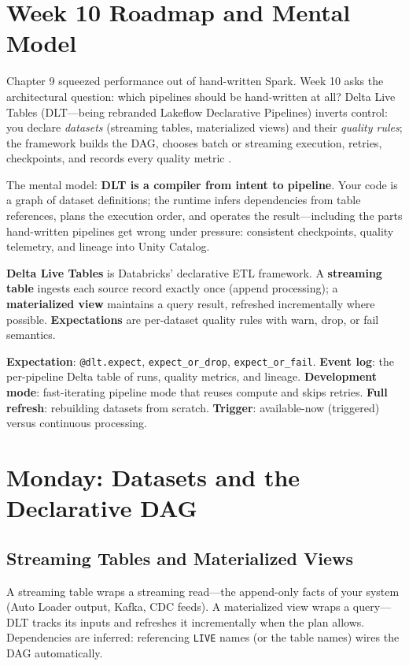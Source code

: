 \section{Week 10 Roadmap and Mental Model}
Chapter 9 squeezed performance out of hand-written Spark. Week 10 asks the architectural question: which pipelines should be hand-written at all? Delta Live Tables (DLT---being rebranded Lakeflow Declarative Pipelines) inverts control: you declare \emph{datasets} (streaming tables, materialized views) and their \emph{quality rules}; the framework builds the DAG, chooses batch or streaming execution, retries, checkpoints, and records every quality metric \cite{databricksDLT}.

The mental model: \textbf{DLT is a compiler from intent to pipeline}. Your code is a graph of dataset definitions; the runtime infers dependencies from table references, plans the execution order, and operates the result---including the parts hand-written pipelines get wrong under pressure: consistent checkpoints, quality telemetry, and lineage into Unity Catalog.

\begin{definitionbox}
\textbf{Delta Live Tables} is Databricks' declarative ETL framework. A \textbf{streaming table} ingests each source record exactly once (append processing); a \textbf{materialized view} maintains a query result, refreshed incrementally where possible. \textbf{Expectations} are per-dataset quality rules with warn, drop, or fail semantics.
\end{definitionbox}

\begin{keyterms}
\textbf{Expectation}: \texttt{@dlt.expect}, \texttt{expect\_or\_drop}, \texttt{expect\_or\_fail}. \textbf{Event log}: the per-pipeline Delta table of runs, quality metrics, and lineage. \textbf{Development mode}: fast-iterating pipeline mode that reuses compute and skips retries. \textbf{Full refresh}: rebuilding datasets from scratch. \textbf{Trigger}: available-now (triggered) versus continuous processing.
\end{keyterms}

\section{Monday: Datasets and the Declarative DAG}
\subsection{Streaming Tables and Materialized Views}
A streaming table wraps a streaming read---the append-only facts of your system (Auto Loader output, Kafka, CDC feeds). A materialized view wraps a query---DLT tracks its inputs and refreshes it incrementally when the plan allows. Dependencies are inferred: referencing \texttt{LIVE} names (or the table names) wires the DAG automatically.

